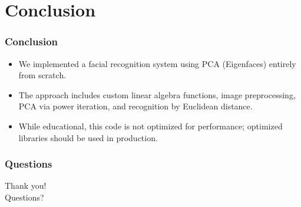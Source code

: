 \documentclass{beamer}
\begin{document}
\section{Conclusion}

\begin{frame}
  \frametitle{Conclusion}
  \begin{itemize}
    \item We implemented a facial recognition system using PCA (Eigenfaces) entirely from scratch.
    \item The approach includes custom linear algebra functions, image preprocessing, PCA via power iteration, and recognition by Euclidean distance.
    \item While educational, this code is not optimized for performance; optimized libraries should be used in production.
  \end{itemize}
\end{frame}

\begin{frame}
  \frametitle{Questions}
  \centering
  \Large Thank you! \\
  \vspace{10mm}
  Questions?
\end{frame}
\end{document}
